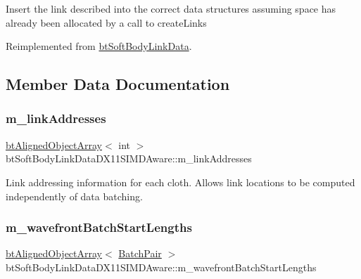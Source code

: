 Insert the link described into the correct data structures assuming space has already been allocated by a call to create\+Links 

Reimplemented from \hyperlink{classbtSoftBodyLinkData_a44f200dcb878405cebf3704dc7a8b8cd}{bt\+Soft\+Body\+Link\+Data}.



\subsection{Member Data Documentation}
\mbox{\label{classbtSoftBodyLinkDataDX11SIMDAware_ac778fd415c477feba8efe6233d62d22a}} 
\subsubsection{\texorpdfstring{m\+\_\+link\+Addresses}{m\_linkAddresses}}
{\footnotesize\ttfamily \hyperlink{classbtAlignedObjectArray}{bt\+Aligned\+Object\+Array}$<$ int $>$ bt\+Soft\+Body\+Link\+Data\+D\+X11\+S\+I\+M\+D\+Aware\+::m\+\_\+link\+Addresses}

Link addressing information for each cloth. Allows link locations to be computed independently of data batching. \mbox{\label{classbtSoftBodyLinkDataDX11SIMDAware_a6d72393afb85fed7bde853ce6e1fcc16}} 
\subsubsection{\texorpdfstring{m\+\_\+wavefront\+Batch\+Start\+Lengths}{m\_wavefrontBatchStartLengths}}
{\footnotesize\ttfamily \hyperlink{classbtAlignedObjectArray}{bt\+Aligned\+Object\+Array}$<$ \hyperlink{structbtSoftBodyLinkDataDX11SIMDAware_1_1BatchPair}{Batch\+Pair} $>$ bt\+Soft\+Body\+Link\+Data\+D\+X11\+S\+I\+M\+D\+Aware\+::m\+\_\+wavefront\+Batch\+Start\+Lengths}

